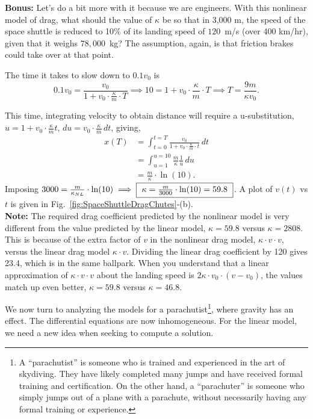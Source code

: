 \textbf{Bonus:} Let's do a bit more with it because we are engineers. With this nonlinear model of drag, what should the value of $\kappa$ be so that in 3,000 m, the speed of the space shuttle is reduced to 10\% of its landing speed of $120$~m/s (over 400 km/hr), given that it weighs $78,000$~kg? The assumption, again, is that friction brakes could take over at that point. 

The time it takes to slow down to $0.1 v_0$ is
$$0.1 v_0 =  \frac{v_0}{1 + v_0 \cdot \frac{\kappa}{m} \cdot T} \implies 10 = 1+ v_0 \cdot \frac{\kappa}{m} \cdot T \implies T = \frac{9 m}{\kappa v_0}.$$

This time, integrating velocity to obtain distance  will require a u-substitution, $u = 1 + v_0 \cdot \frac{\kappa}{m} t$, $du =  v_0 \cdot \frac{\kappa}{m} \, dt$, giving, 
\begin{align*}
    x(T) &= \int_{t=0}^{t=T} \frac{v_0}{1 + v_0 \cdot \frac{\kappa}{m} \cdot t} \, dt \\[1em]
    &= \int_{u=1}^{u=10} \frac{m}{\kappa} \frac{1}{u} \, du \\[1em]
    &= \frac{m}{\kappa} \cdot \ln(10).
\end{align*}
Imposing $3000 =  \frac{m}{\kappa_{NL}} \cdot \ln(10) \implies \fbox{ $ \kappa = \frac{m}{3000} \cdot \ln(10) = 59.8 $ }$. A plot of $v(t)$ vs $t$ is given in Fig.~\ref{fig:SpaceShuttleDragChutes}-(b).\\

\textbf{Note:} The required drag coefficient predicted by the nonlinear model is very different from the value predicted by the linear model, $\kappa = 59.8$ versus $ \kappa = 2808$. This is because of the extra factor of $v$ in the nonlinear drag model, $\kappa\cdot v \cdot v$, versus the linear drag model $\kappa \cdot v$. Dividing the linear drag coefficient by 120 gives 23.4, which is in the same ballpark. When you understand that a linear approximation of $\kappa\cdot v \cdot v$ about the landing speed is $2 \kappa \cdot v_0 \cdot (v-v_0)$, the values match up even better, $\kappa = 59.8$ versus $ \kappa = 46.8$. 
\Qed

\bigskip

We now turn to analyzing the models for a parachutist\footnote{A ``parachutist'' is someone who is trained and experienced in the art of skydiving. They have likely completed many jumps and have received formal training and certification. On the other hand, a ``parachuter'' is someone who simply jumps out of a plane with a parachute, without necessarily having any formal training or experience.}, where gravity has an effect. The differential equations are now inhomogeneous. For the linear model, we need a new idea when seeking to compute a solution.


